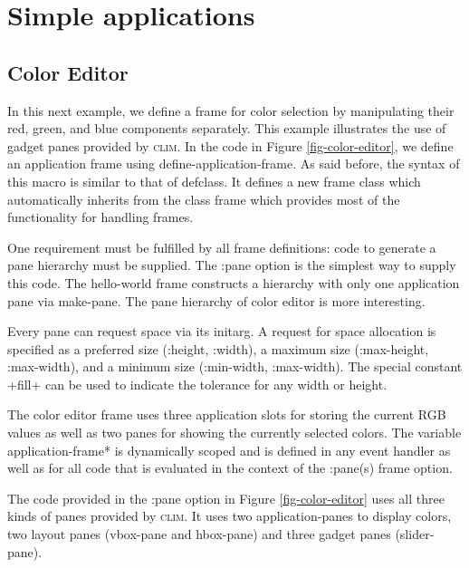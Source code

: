\documentclass[twocolumn,a4paper]{article}
\newcommand {\code}[1]{{\sffamily #1}}
\newcommand {\CLIM}{\textsc{clim}}
\let\class\code
\let\method\code
\let\constant\code
\let\variable\code
\let\keyword\code
\begin{document}
\section{Simple applications}

\subsection{Color Editor} In this next example, we define a frame for
color selection by manipulating their red, green, and blue components
separately. This example illustrates the use of gadget panes provided
by \CLIM{}. In the code in Figure \ref{fig-color-editor}, we define an
application frame using \method{define-application-frame}. As said
before, the syntax of this macro is similar to that of \class{defclass}. It
defines a new frame class which automatically inherits from the class
\class{frame} which provides most of the functionality for handling
frames.

One requirement must be fulfilled by all frame definitions: code to
generate a pane hierarchy must be supplied. The \keyword{:pane} option
is the simplest way to supply this code.  The \class{hello-world} frame
constructs a hierarchy with only one application pane via
\method{make-pane}. The pane hierarchy of color editor is more
interesting.

Every pane can request space via its initarg. A request for space
allocation is specified as a preferred size (\keyword{:height},
\keyword{:width}), a maximum size (\keyword{:max-height},
\keyword{:max-width}), and a minimum size (\keyword{:min-width},
\keyword{:max-width}). The special constant \constant{+fill+} can be
used to indicate the tolerance for any width or height.

The color editor frame uses three application slots for storing the
current RGB values as well as two panes for showing the currently
selected colors. The variable \variable{*application-frame*} is
dynamically scoped and is defined in any event handler as well as for
all code that is evaluated in the context of the \keyword{:pane(s)}
frame option.

\begin{figure*} \lstset{style=framestyle}

\caption{Color Editor}\label{fig-color-editor}
\end{figure*}

The code provided in the \keyword{:pane} option in Figure
\ref{fig-color-editor} uses all three kinds of panes provided by
\CLIM{}. It uses two application-panes to display colors, two layout
panes (\class{vbox-pane} and \class{hbox-pane}) and three gadget panes
(\class{slider-pane}).
\end{document}

